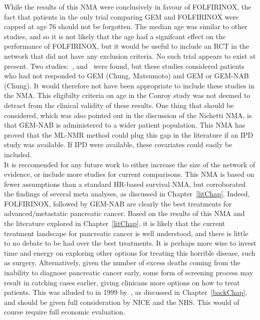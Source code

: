While the results of this NMA were conclusively in favour of FOLFIRINOX, the fact that patients in the only trial comparing GEM and FOLFIRINOX were capped at age 76 should not be forgotten. The median age was similar to other studies, and so it is not likely that the age had a signifcant effect on the performance of FOLFIRINOX, but it would be useful to include an RCT in the network that did not have any exclusion criteria. No such trial appears to exist at present. Two studies:~\cite{matsumoto}, and~\cite{chung} were found, but these studies considered patients who had not responded to GEM (Chung, Matsumoto) and GEM or GEM-NAB (Chung). It would therefore not have been appropriate to include these studies in the NMA. This eligibilty criteria on age in the Conroy study was not deemed to detract from the clinical validity of these results. One thing that should be considered, which was also pointed out in the discussion of the Nichetti NMA, is that GEM-NAB is administered to a wider patient population. This NMA has proved that the ML-NMR method could plug this gap in the literature if an IPD study was available. If IPD were available, these covariates could easily be included. \\

It is reccomended for any future work to either increase the size of the network of evidence, or include more studies for current comparisons. This NMA is based on fewer assumptions than a standard HR-based survival NMA, but corroborated the findings of several meta analyses, as discussed in Chapter~\ref{litChap}. Indeed, FOLFIRINOX, followed by GEM-NAB are clearly the best treatments for advanced/metastatic pancreatic cancer. Based on the results of this NMA and the literature explored in Chapter~\ref{litChap}, it is likely that the current treatment landscape for pancreatic cancer is well understood, and there is little to no debate to be had over the best treatments. It is perhaps more wise to invest time and energy on exploring other options for treating this horrible disease, such as surgery. Alternatively, given the number of excess deaths coming from the inability to diagnose pancreatic cancer early, some form of screening process may result in catching cases earlier, giving clinicans more options on how to treat patients. This was alluded to in 1999 by~\cite{dimagno}, as discussed in Chapter~\ref{backChap}, and should be given full consideration by NICE and the NHS. This would of course require full economic evaluation. \\

